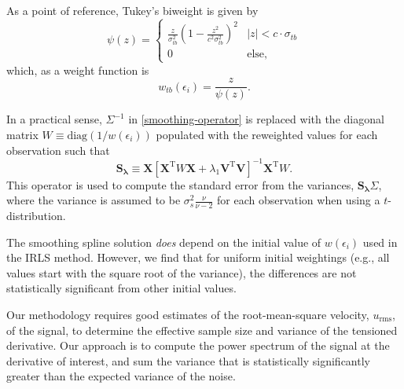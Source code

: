\documentclass{ametsoc}
\begin{document}
As a point of reference, Tukey's biweight is given by
\begin{equation}
\label{tukey-biweight}
\psi(z) = 
\begin{cases}
\frac{z}{\sigma_{tb}^2} \left(1-\frac{z^2}{c^2 \sigma_{tb}^2} \right)^2 & |z| < c \cdot \sigma_{tb} \\
0 & \textrm{else},
\end{cases}
\end{equation}
which, as a weight function is
\begin{equation}
    w_{tb}(\epsilon_i) = \frac{z}{\psi(z)}.
\end{equation}

In a practical sense, $\Sigma^{-1}$ in \eqref{smoothing-operator} is replaced with the diagonal matrix $W\equiv\textrm{diag}(1/w(\epsilon_i))$ populated with the reweighted values for each observation such that
\begin{equation}
\label{general-smoothing-operator}
\mathbf{S_\lambda} \equiv \mathbf{X} \left[ \mathbf{X}^{\textrm{T}} W \mathbf{X} + \lambda_1 \mathbf{V}^{\textrm{T}} \mathbf{V} \right]^{-1} \mathbf{X}^{\textrm{T}} W.
\end{equation}
This operator is used to compute the standard error from the variances,  $\mathbf{S_\lambda} \Sigma$, where the variance is assumed to be $\sigma_s^2 \frac{\nu}{\nu-2}$ for each observation when using a $t$-distribution.

The smoothing spline solution \emph{does} depend on the initial value of $w(\epsilon_i)$ used in the IRLS method. However, we find that for uniform initial weightings (e.g., all values start with the square root of the variance), the differences are not statistically significant from other initial values.

\appendix[C]
\label{appendixC:variance_estimate}

Our methodology requires good estimates of the root-mean-square velocity, $u_{\textrm{rms}}$, of the signal, to determine the effective sample size and variance of the tensioned derivative. Our approach is to compute the power spectrum of the signal at the derivative of interest, and sum the variance that is statistically significantly greater than the expected variance of the noise.
\end{document}

